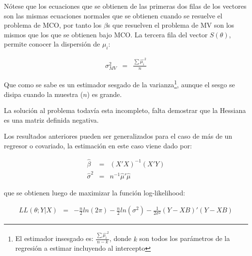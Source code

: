 \begin{frame}
	Nótese que los ecuaciones que se obtienen de las primeras dos
	filas de los vectores son las mismas ecuaciones normales que se
	obtienen cuando se resuelve el problema de MCO, por tanto los
	$\beta$s que resuelven el problema de MV son los mismos que los
	que se obtienen bajo MCO. La tercera fila del vector $S(\theta)$,
	permite conocer la dispersión de $\mu_i$:
	
	\begin{eqnarray*}
		\sigma^2_{MV} &=& \frac{\sum \hat{\mu_i}^2}{n}
	\end{eqnarray*}
	
	Que como se sabe es un estimador sesgado de la
	varianza\footnote{El estimador insesgado es: $\frac{\sum
			\hat{\mu_i}^2}{n-k}$, donde $k$ son todos los parámetros de la
		regresión a estimar incluyendo al intercepto}, aunque el sesgo se
	disipa cuando la muestra ($n$) es grande.
	\bigskip
	
	La solución al problema todavía esta incompleto, falta demostrar
	que la Hessiana es una matriz definida negativa.
\end{frame}

\begin{frame}
	Los resultados anteriores pueden ser generalizados para el caso de
	más de un regresor o covariado, la estimación en este caso viene
	dado por:
	
	\begin{eqnarray*}
		\hat{\beta} &=& (X'X)^{-1}(X'Y) \\
		\hat{\sigma}^2 &=& n^{-1}\hat{\mu}'\hat{\mu}
	\end{eqnarray*}
	
	que se obtienen luego de maximizar la función log-likelihood:
	
	\begin{eqnarray}
		LL(\theta; Y|X) &=&
		-\frac{n}{2}ln(2\pi)-\frac{n}{2}ln(\sigma^2)-\frac{1}{2\sigma^2}(Y-XB)'(Y-XB)
	\end{eqnarray}
\end{frame}


